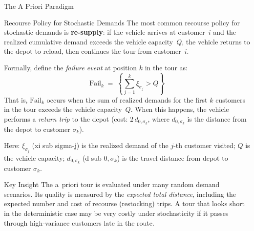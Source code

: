 \documentclass[aspectratio=169,10pt]{beamer}
\begin{document}
\begin{frame}[allowframebreaks]{The A Priori Paradigm}
  \framebreak

  \begin{block}{Recourse Policy for Stochastic Demands}
    The most common recourse policy for stochastic demands is
    \textbf{re-supply}: if the vehicle arrives at customer~$i$ and the
    realized cumulative demand exceeds the vehicle capacity~$Q$, the vehicle
    returns to the depot to reload, then continues the tour from customer~$i$.

    Formally, define the \emph{failure event} at position $k$ in the tour as:
    \[
      \text{Fail}_k \;=\; \left\{ \sum_{j=1}^{k} \xi_{\sigma_j} > Q \right\}
    \]
    That is, $\text{Fail}_k$ occurs when the sum of realized demands for the
    first $k$ customers in the tour exceeds the vehicle capacity~$Q$.
    When this happens, the vehicle performs a \emph{return trip} to the
    depot (cost: $2\, d_{0,\sigma_k}$, where $d_{0,\sigma_k}$ is the
    distance from the depot to customer $\sigma_k$).
  \end{block}

  Here:
  $\xi_{\sigma_j}$ (xi sub sigma-j) is the realized demand of the $j$-th
  customer visited;
  $Q$ is the vehicle capacity;
  $d_{0,\sigma_k}$ (d sub $0,\sigma_k$) is the travel distance from depot
  to customer $\sigma_k$.

  \begin{alertblock}{Key Insight}
    The a~priori tour is evaluated under many random demand scenarios.
    Its quality is measured by the \emph{expected total distance},
    including the expected number and cost of recourse (restocking) trips.
    A tour that looks short in the deterministic case may be very costly
    under stochasticity if it passes through high-variance customers late in
    the route.
  \end{alertblock}

\end{frame}
\end{document}
